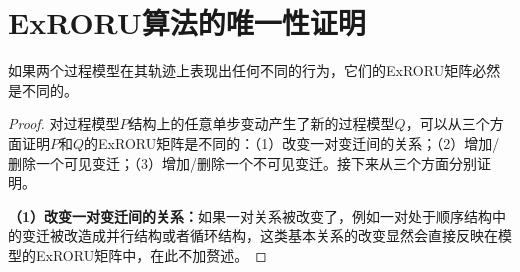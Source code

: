 
\chapter{ExRORU算法的唯一性证明}
\label{app:uniqueness}

\begin{theorem}[唯一性]
如果两个过程模型在其轨迹上表现出任何不同的行为，它们的ExRORU矩阵必然是不同的。
\end{theorem}

\begin{proof}
对过程模型$P$结构上的任意单步变动产生了新的过程模型$Q$，可以从三个方面证明$P$和$Q$的ExRORU矩阵是不同的：（1）改变一对变迁间的关系；（2）增加/删除一个可见变迁；（3）增加/删除一个不可见变迁。接下来从三个方面分别证明。

\textbf{（1）改变一对变迁间的关系：}如果一对关系被改变了，例如一对处于顺序结构中的变迁被改造成并行结构或者循环结构，这类基本关系的改变显然会直接反映在模型的ExRORU矩阵中，在此不加赘述。


\end{proof}
